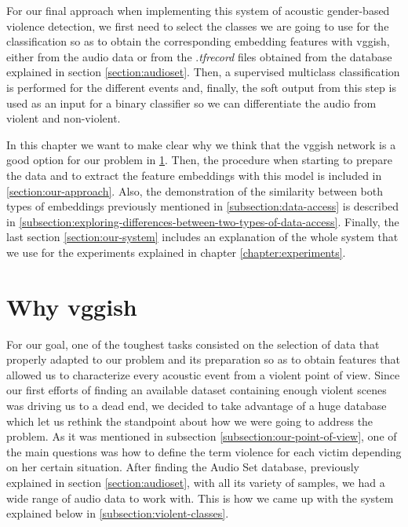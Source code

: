 
	\label{chapter:our-approach-for-avd}
	
	For our final approach when implementing this system of acoustic gender-based violence detection, we first need to select the classes we are going to use for the classification so as to obtain the corresponding embedding features with \acrshort{vgg}ish, either from the audio data or from the .\textit{tfrecord} files obtained from the database explained in section \ref{section:audioset}. Then, a supervised multiclass classification is performed for the different events and, finally, the soft output from this step is used as an input for a binary classifier so we can differentiate the audio from violent and non-violent.
	
	In this chapter we want to make clear why we think that the \acrshort{vgg}ish network is a good option for our problem in \ref{section:why-vggish}. Then, the procedure when starting to prepare the data and to extract the feature embeddings with this model is included in \ref{section:our-approach}. Also, the demonstration of the similarity between both types of embeddings previously mentioned in \ref{subsection:data-access} is described in \ref{subsection:exploring-differences-between-two-types-of-data-access}. Finally, the last section \ref{section:our-system} includes an explanation of the whole system that we use for the experiments explained in chapter \ref{chapter:experiments}.

\section{Why \acrshort{vgg}ish}
\label{section:why-vggish}

	For our goal, one of the toughest tasks consisted on the selection of data that properly adapted to our problem and its preparation so as to obtain features that allowed us to characterize every acoustic event from a violent point of view. Since our first efforts of finding an available dataset containing enough violent scenes was driving us to a dead end, we decided to take advantage of a huge database which let us rethink the standpoint about how we were going to address the problem. As it was mentioned in subsection \ref{subsection:our-point-of-view}, one of the main questions was how to define the term violence for each victim depending on  her certain situation. After finding the Audio Set database, previously explained in section \ref{section:audioset}, with all its variety of samples, we had a wide range of audio data to work with. This is how we came up with the system explained below in \ref{subsection:violent-classes}.

